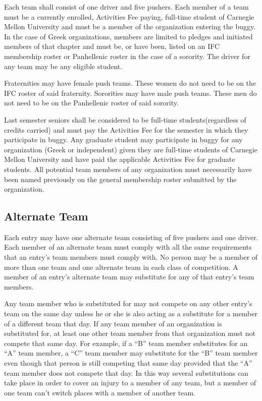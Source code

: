 	Each team shall consist of one driver and five pushers. Each member of a team
	must be a currently enrolled, Activities Fee paying, full-time student of
	Carnegie Mellon University and must be a member of the organization entering
	the buggy. In the case of Greek organizations, members are limited to pledges
	and initiated members of that chapter and must be, or have been, listed on an
	IFC membership roster or Panhellenic roster in the case of a sorority. The
	driver for any team may be any eligible student.

	Fraternities may have female push teams. These women do not need to be on the
	IFC roster of said fraternity. Sororities may have male push teams. These men
	do not need to be on the Panhellenic roster of said sorority.

	Last semester seniors shall be considered to be full-time students(regardless
	of credits carried) and must pay the Activities Fee for the semester in which
	they participate in buggy. Any graduate student may participate in buggy for
	any organization (Greek or independent) given they are full-time students of
	Carnegie Mellon University and have paid the applicable Activities Fee for
	graduate students. All potential team members of any organization must
	necessarily have been named previously on the general membership roster
	submitted by the organization.

\subsection{Alternate Team}

	Each entry may have one alternate team consisting of five pushers and one
	driver. Each member of an alternate team must comply with all the same
	requirements that an entry's team members must comply with. No person may be a
	member of more than one team and one alternate team in each class of
	competition. A member of an entry's alternate team may substitute for any of
	that entry's team members.

	Any team member who is substituted for may not compete on any other entry's
	team on the same day unless he or she is also acting as a substitute for a
	member of a different team that day. If any team member of an organization is
	substituted for, at least one other team member from that organization must not
	compete that same day. For example, if a ``B'' team member substitutes for an
	``A'' team member, a ``C'' team member may substitute for the ``B'' team member
	even though that person is still competing that same day provided that the
	``A'' team member does not compete that day. In this way several substitutions
	can take place in order to cover an injury to a member of any team, but a
	member of one team can't switch places with a member of another team.

